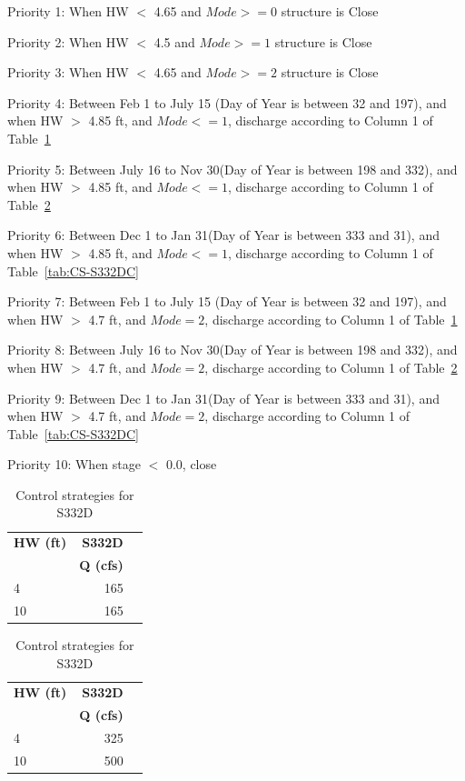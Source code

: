 \begin{packed_items}
\item Priority 1: When HW $<$ 4.65 and $Mode>=0$ structure is Close
\item Priority 2: When HW $<$ 4.5 and $Mode>=1$ structure is Close
\item Priority 3: When HW $<$ 4.65 and $Mode>=2$ structure is Close
\item Priority 4: Between Feb 1 to July 15 (Day of Year is between 32 and 197), and when HW $>$ 4.85 ft, and $Mode<=1$,  discharge according to Column 1 of Table~\ref{tab:CS-S332DA}
\item Priority 5: Between July 16 to Nov 30(Day of Year is between 198 and 332), and when HW $>$ 4.85 ft, and $Mode<=1$,  discharge according to Column 1 of Table~\ref{tab:CS-S332DB}
\item Priority 6: Between Dec 1 to Jan 31(Day of Year is between 333 and 31), and when HW $>$ 4.85 ft, and $Mode<=1$,  discharge according to Column 1 of Table~\ref{tab:CS-S332DC}
\item Priority 7: Between Feb 1 to July 15 (Day of Year is between 32 and 197), and when HW $>$ 4.7 ft, and $Mode=2$,  discharge according to Column 1 of Table~\ref{tab:CS-S332DA}
\item Priority 8: Between July 16 to Nov 30(Day of Year is between 198 and 332), and when HW $>$ 4.7 ft, and $Mode=2$,  discharge according to Column 1 of Table~\ref{tab:CS-S332DB}
\item Priority 9: Between Dec 1 to Jan 31(Day of Year is between 333 and 31), and when HW $>$ 4.7 ft, and $Mode=2$,  discharge according to Column 1 of Table~\ref{tab:CS-S332DC}
\item Priority 10: When stage $<$ 0.0, close
\end{packed_items}

\footnotesize
\begin{table}[!h]
\centering
\caption{Control strategies for S332D}
\label{tab:CS-S332DA}
\begin{tabular}{l|rr}
\hline
\textbf{HW (ft)} &  \textbf{S332D} \\
\textbf{       } & \textbf{Q (cfs)} \\
\hline
4	     &    165  \\
10	     &    165  \\
\hline
\end{tabular}
\end{table}
\normalsize

\footnotesize
\begin{table}[!h]
\centering
\caption{Control strategies for S332D}
\label{tab:CS-S332DB}
\begin{tabular}{l|rr}
\hline
\textbf{HW (ft)} &  \textbf{S332D} \\
\textbf{       } & \textbf{Q (cfs)} \\
\hline
4	     &    325  \\
10	     &    500  \\
\hline
\end{tabular}
\end{table}
\normalsize

